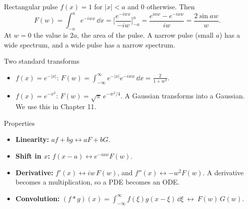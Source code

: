 \begin{examplebox}{Rectangular pulse}
$f(x)=1$ for $|x|<a$ and $0$ otherwise. Then
\[ F(w) = \int_{-a}^{a}e^{-iwx}\,\dd x = \Big[\frac{e^{-iwx}}{-iw}\Big]_{-a}^{a} = \frac{e^{iaw} - e^{-iaw}}{iw} = \frac{2\sin aw}{w}. \]
At $w=0$ the value is $2a$, the area of the pulse. A narrow pulse (small $a$) has a wide spectrum, and a wide pulse has a narrow spectrum.
\end{examplebox}

\begin{examplebox}{Two standard transforms}
\begin{itemize}
  \item $f(x) = e^{-|x|}$: $F(w) = \displaystyle\int_{-\infty}^{\infty}e^{-|x|}e^{-iwx}\,\dd x = \frac{2}{1+w^2}$.
  \item $f(x)=e^{-x^2}$: $F(w) = \sqrt\pi\,e^{-w^2/4}$. A Gaussian transforms into a Gaussian. We use this in Chapter 11.
\end{itemize}
\end{examplebox}

\begin{defbox}{Properties}
\begin{itemize}
  \item \textbf{Linearity:} $af+bg \leftrightarrow aF+bG$.
  \item \textbf{Shift in $x$:} $f(x-a)\leftrightarrow e^{-iaw}F(w)$.
  \item \textbf{Derivative:} $f'(x)\leftrightarrow iw\,F(w)$, and $f''(x)\leftrightarrow -w^2F(w)$. A derivative becomes a multiplication, so a PDE becomes an ODE.
  \item \textbf{Convolution:} $(f*g)(x) = \displaystyle\int_{-\infty}^{\infty}f(\xi)g(x-\xi)\,\dd\xi\ \leftrightarrow\ F(w)\,G(w)$.
\end{itemize}
\end{defbox}

